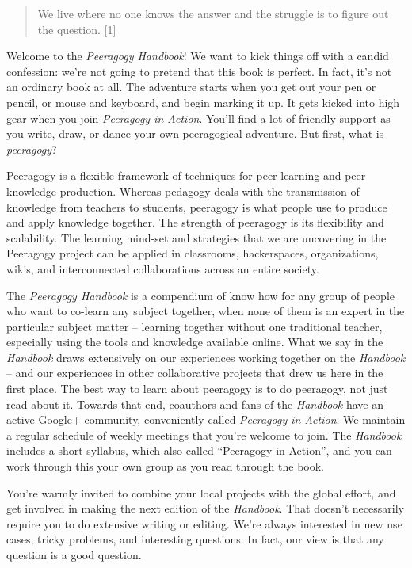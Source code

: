 \begin{quote}
We live where no one knows the answer and the struggle is to figure out
the question. {[}1{]}
\end{quote}

Welcome to the \emph{Peeragogy Handbook}! We want to kick things off
with a candid confession: we're not going to pretend that this book is
perfect. In fact, it's not an ordinary book at all. The adventure
starts when you get out your pen or pencil, or mouse and keyboard, and
begin marking it up.  It gets kicked into high gear when you join
\emph{Peeragogy in Action}.  You'll find 
a lot of friendly support as you write, draw, or dance your own
peeragogical adventure.  But first, what is \emph{peeragogy}?

Peeragogy is a flexible framework of techniques for peer learning and
peer knowledge production. Whereas pedagogy deals with the transmission
of knowledge from teachers to students, peeragogy is what people use to
produce and apply knowledge together. The strength of peeragogy is its
flexibility and scalability. The learning mind-set and strategies that
we are uncovering in the Peeragogy project can be applied in classrooms,
hackerspaces, organizations, wikis, and interconnected collaborations
across an entire society.

The \emph{Peeragogy Handbook} is a compendium of know how for any group
of people who want to co-learn any subject together, when none of them
is an expert in the particular subject matter -- learning together
without one traditional teacher, especially using the tools and
knowledge available online. What we say in the \emph{Handbook} draws
extensively on our experiences working together on the \emph{Handbook}
-- and our experiences in other collaborative projects that drew us here
in the first place. The best way to learn about peeragogy is to do
peeragogy, not just read about it.
Towards that end, coauthors and fans of the \emph{Handbook} have an active Google+ community,
conveniently called \emph{Peeragogy in Action}.
We maintain a regular schedule of weekly meetings that you're welcome to join.
The \emph{Handbook} includes a short syllabus, which also called
``Peeragogy in Action'', and you can work through this your own group
as you read through the book.

You're warmly invited to combine your local projects with the global
effort, and get involved in making the next edition of the
\emph{Handbook}.  That
doesn't necessarily require you to do extensive writing or editing.
We're always interested in new use cases, tricky problems, and
interesting questions. In fact, our view is that any question is a good
question.

